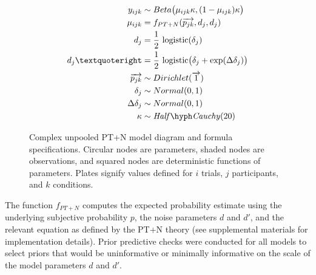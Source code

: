 \documentclass[
  man,floatsintext]{apa6}
\begin{document}
\begin{figure}
  \begin{minipage}{.5\textwidth}
    \flushright
    
  \end{minipage}%
  \begin{minipage}{.5\textwidth}
    \flushleft
    \small
    \begin{align*}
      y_{ijk} &\sim Beta\big(\mu_{ijk} \kappa, (1-\mu_{ijk}) \kappa \big) \\
      \mu_{ijk} &= f_{PT+N}(\overrightarrow{p_{jk}}, d_j, d_j)  \\
      d_j &= \frac{1}{2} \ \text{logistic}(\delta_j) \\
      d_j’ &= \frac{1}{2} \ \text{logistic}\big(\delta_j + \exp(\Delta\delta_j)\big) \\
      \overrightarrow{p_{jk}} &\sim Dirichlet(\overrightarrow{1}) \\
      \delta_j &\sim Normal(0,1) \\
      \Delta\delta_j &\sim Normal(0,1) \\
      \kappa &\sim \mathit{Half \hyph Cauchy}(20)
    \end{align*}
  \end{minipage}
  \caption{Complex unpooled PT+N model diagram and formula specifications. Circular nodes are parameters, shaded nodes are observations, and squared nodes are deterministic functions of parameters. Plates signify values defined for $i$ trials, $j$ participants, and $k$ conditions.}
\end{figure}

The function \(f_{PT+N}\) computes the expected probability estimate using the underlying subjective probability \(p\), the noise parameters \(d\) and \(d'\), and the relevant equation as defined by the PT+N theory (see supplemental materials for implementation details). Prior predictive checks were conducted for all models to select priors that would be uninformative or minimally informative on the scale of the model parameters \(d\) and \(d'\).
\end{document}
